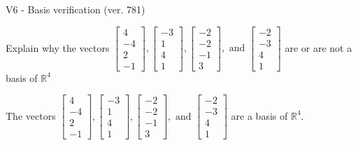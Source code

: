 \begin{exercise}
  \begin{exerciseTitle}V6 - Basis verification (ver. 781)\end{exerciseTitle}
  \begin{exerciseStatement}
    Explain why the vectors \(\left[\begin{array}{r}
4 \\
-4 \\
2 \\
-1
\end{array}\right] , \left[\begin{array}{r}
-3 \\
1 \\
4 \\
1
\end{array}\right] , \left[\begin{array}{r}
-2 \\
-2 \\
-1 \\
3
\end{array}\right] , \text{ and } \left[\begin{array}{r}
-2 \\
-3 \\
4 \\
1
\end{array}\right]\) are or are not a basis of \(\mathbb{R}^4\)	


  \end{exerciseStatement}
  \begin{exerciseAnswer}
   The vectors \(\left[\begin{array}{r}
4 \\
-4 \\
2 \\
-1
\end{array}\right] , \left[\begin{array}{r}
-3 \\
1 \\
4 \\
1
\end{array}\right] , \left[\begin{array}{r}
-2 \\
-2 \\
-1 \\
3
\end{array}\right] , \text{ and } \left[\begin{array}{r}
-2 \\
-3 \\
4 \\
1
\end{array}\right]\) 
  	 are  a basis of \(\mathbb{R}^4\).
  


  \end{exerciseAnswer}
\end{exercise}